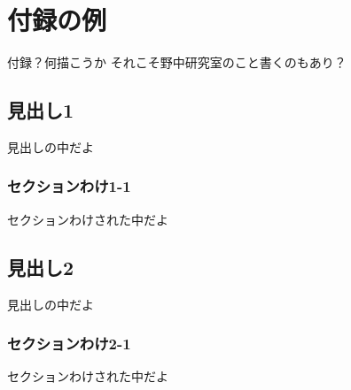 \chapter{付録の例}

付録？何描こうか
それこそ野中研究室のこと書くのもあり？

\section{見出し1}

見出しの中だよ

\subsection{セクションわけ1-1}
セクションわけされた中だよ

\section{見出し2}

見出しの中だよ

\subsection{セクションわけ2-1}

セクションわけされた中だよ
